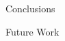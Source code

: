 \documentclass[10pt,xcolor=table]{beamer}
\begin{document}
\begin{frame}{Conclusions}
%			
%		


\end{frame}





\begin{frame}{Future Work}
%
%
%
%

\end{frame}
	
\end{document}
